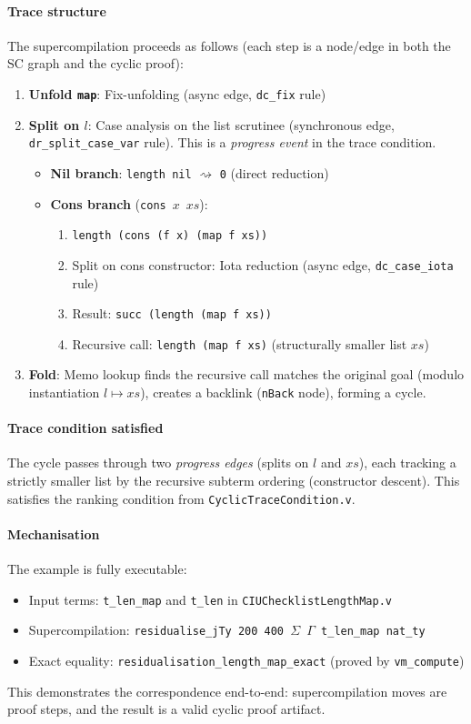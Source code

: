 \paragraph{Trace structure}
The supercompilation proceeds as follows (each step is a node/edge in both the SC graph and the cyclic proof):
\begin{enumerate}[leftmargin=*]
\item \textbf{Unfold \texttt{map}}: Fix-unfolding (async edge, \texttt{dc\_fix} rule)
\item \textbf{Split on $l$}: Case analysis on the list scrutinee (synchronous edge, \texttt{dr\_split\_case\_var} rule). This is a \emph{progress event} in the trace condition.
  \begin{itemize}
  \item \textbf{Nil branch}: \texttt{length nil} $\rightsquigarrow$ \texttt{0} (direct reduction)
  \item \textbf{Cons branch} (\texttt{cons}~$x$~$xs$): 
  \begin{enumerate}
    \item \texttt{length (cons (f x) (map f xs))}
    \item Split on cons constructor: Iota reduction (async edge, \texttt{dc\_case\_iota} rule)
    \item Result: \texttt{succ (length (map f xs))}
    \item Recursive call: \texttt{length (map f xs)} (structurally smaller list $xs$)
  \end{enumerate}
  \end{itemize}
\item \textbf{Fold}: Memo lookup finds the recursive call matches the original goal (modulo instantiation $l \mapsto xs$), creates a backlink (\texttt{nBack} node), forming a cycle.
\end{enumerate}

\paragraph{Trace condition satisfied}
The cycle passes through two \emph{progress edges} (splits on $l$ and $xs$), each tracking a strictly smaller list by the recursive subterm ordering (constructor descent). This satisfies the ranking condition from \texttt{CyclicTraceCondition.v}.

\paragraph{Mechanisation}
The example is fully executable:
\begin{itemize}[leftmargin=*]
\item Input terms: \texttt{t\_len\_map} and \texttt{t\_len} in \texttt{CIUChecklistLengthMap.v}
\item Supercompilation: \texttt{residualise\_jTy 200 400 $\Sigma$ $\Gamma$ t\_len\_map nat\_ty}
\item Exact equality: \texttt{residualisation\_length\_map\_exact} (proved by \texttt{vm\_compute})
\end{itemize}

This demonstrates the correspondence end-to-end: supercompilation moves are proof steps, and the result is a valid cyclic proof artifact.
